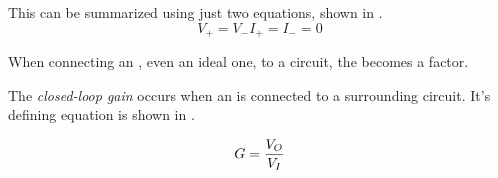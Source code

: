 This can be summarized using just two equations, shown in .
\begin{subequations}
  \begin{equation}\label{eq:Ideal_Op-Amp-Voltage}
    V_{+} = V_{-}
  \end{equation}
  \begin{equation}\label{eq:Ideal_Op-Amp-Current}
    I_{+} = I_{-} = 0
  \end{equation}
\end{subequations}

When connecting an , even an ideal one, to a circuit, the  becomes a factor.

\begin{definition}\label{def:Closed-Loop_Gain}
  The \emph{closed-loop gain} occurs when an  is connected to a surrounding circuit.
  It's defining equation is shown in .

  \begin{equation}\label{eq:Closed-Loop_Gain}
    G = \frac{V_{O}}{V_{I}}
  \end{equation}
\end{definition}


